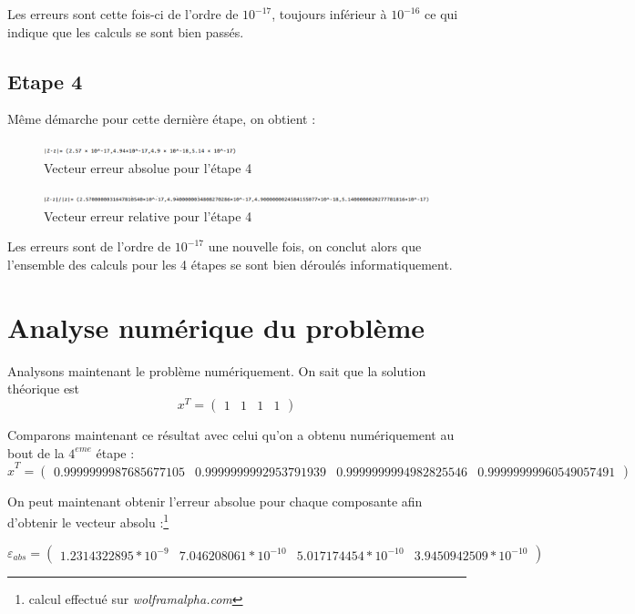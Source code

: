 \documentclass[12,french]{report}
\begin{document}
Les erreurs sont cette fois-ci de l'ordre de $10^{-17}$, toujours inférieur à $10^{-16}$ ce qui indique que les calculs se sont bien passés.

\section{Etape 4}

Même démarche pour cette dernière étape, on obtient :

\begin{figure}[H]
	\center
	\includegraphics[width=0.5\textwidth]{./Images/err_abs_x_4}
	\caption{Vecteur erreur absolue pour l'étape 4}
\end{figure}
\begin{figure}[H]
	\center
	\includegraphics[width=1\textwidth]{./Images/err_rel_x_4}
	\caption{Vecteur erreur relative pour l'étape 4}
\end{figure}

Les erreurs sont de l'ordre de $10^{-17}$ une nouvelle fois, on conclut alors que l'ensemble des calculs pour les 4 étapes se sont bien déroulés informatiquement.

\chapter{Analyse numérique du problème} %

Analysons maintenant le problème numériquement. On sait que la solution théorique est
$$x^T=\left(\begin{array}{cccc}
1 & 1 & 1 & 1\end{array}\right)$$

Comparons maintenant ce résultat avec celui qu'on a obtenu numériquement au bout de la $4^{eme}$ étape :
$$\hat{x}^T=\left(\begin{array}{cccc}
0.9999999987685677105 & 0.9999999992953791939 & 0.9999999994982825546 & 0.99999999960549057491\end{array}\right)$$\vspace{0cm}

On peut maintenant obtenir l'erreur absolue pour chaque composante afin d'obtenir le vecteur absolu :\footnote{calcul effectué sur \textit{wolframalpha.com}}

$$\varepsilon_{abs}=\left(\begin{array}{cccc}
1.2314322895*10^{-9} & 7.046208061*10^{-10} & 5.017174454*10^{-10} & 3.9450942509*10^{-10} \end{array}\right)$$\vspace{0cm}
\end{document}
